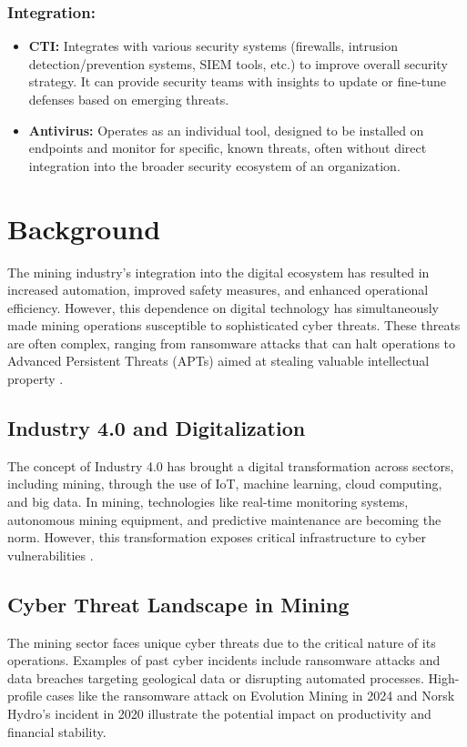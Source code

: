 \documentclass[a4paper,twoside,12pt]{report}
\begin{document}
\subsubsection{Integration:}
\begin{itemize}
    \item \textbf{CTI:} Integrates with various security systems (firewalls, intrusion detection/prevention systems, SIEM tools, etc.) to improve overall security strategy. It can provide security teams with insights to update or fine-tune defenses based on emerging threats.
    
    \item \textbf{Antivirus:} Operates as an individual tool, designed to be installed on endpoints and monitor for specific, known threats, often without direct integration into the broader security ecosystem of an organization.
\end{itemize}

\section{Background}
The mining industry's integration into the digital ecosystem has resulted in increased automation, improved safety measures, and enhanced operational efficiency. However, this dependence on digital technology has simultaneously made mining operations susceptible to sophisticated cyber threats. These threats are often complex, ranging from ransomware attacks that can halt operations to Advanced Persistent Threats (APTs) aimed at stealing valuable intellectual property \citet{gately2023russian}.

\subsection{Industry 4.0 and Digitalization}
The concept of Industry 4.0 has brought a digital transformation across sectors, including mining, through the use of IoT, machine learning, cloud computing, and big data. In mining, technologies like real-time monitoring systems, autonomous mining equipment, and predictive maintenance are becoming the norm. However, this transformation exposes critical infrastructure to cyber vulnerabilities \citep{wang2013cyber, sajid2016cloud}.

\subsection{Cyber Threat Landscape in Mining}
The mining sector faces unique cyber threats due to the critical nature of its operations. Examples of past cyber incidents include ransomware attacks and data breaches targeting geological data or disrupting automated processes. High-profile cases like the ransomware attack on Evolution Mining in 2024 and Norsk Hydro's incident in 2020 illustrate the potential impact on productivity and financial stability.
\end{document}
